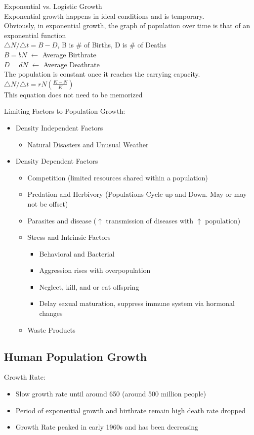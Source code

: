 \documentclass{article}
\begin{document}
Exponential vs. Logistic Growth\\
Exponential growth happens in ideal conditions and is temporary.\\
Obviously, in exponential growth, the graph of population over time is that of an exponential function\\
${\triangle N}/{\triangle t}=B-D$, B is \# of Births, D is \# of Deaths\\
$B=bN$ $\leftarrow$ Average Birthrate\\
$D=dN$ $\leftarrow$ Average Deathrate\\
The population is constant once it reaches the carrying capacity.\\
${\triangle N}/{\triangle t}=rN(\frac{K-N}{K})$\\
This equation does not need to be memorized

Limiting Factors to Population Growth:
\begin{itemize}
\item Density Independent Factors
\begin{itemize}
\item Natural Disasters and Unusual Weather
\end{itemize}
\item Density Dependent Factors
\begin{itemize}
\item Competition (limited resources shared within a population)
\item Predation and Herbivory (Populations Cycle up and Down. May or may not be offset)
\item Parasites and disease ($\uparrow$ transmission of diseases with $\uparrow$ population)
\item Stress and Intrinsic Factors
\begin{itemize}
\item Behavioral and Bacterial
\item Aggression rises with overpopulation
\item Neglect, kill, and or eat offspring
\item Delay sexual maturation, suppress immune system via hormonal changes
\end{itemize}
\item Waste Products
\end{itemize}
\end{itemize}

\subsection{Human Population Growth}
Growth Rate:
\begin{itemize}
\item Slow growth rate until around 650 (around 500 million people)
\item Period of exponential growth and birthrate remain high death rate dropped
\item Growth Rate peaked in early 1960s and has been decreasing
\end{itemize}
\end{document}
